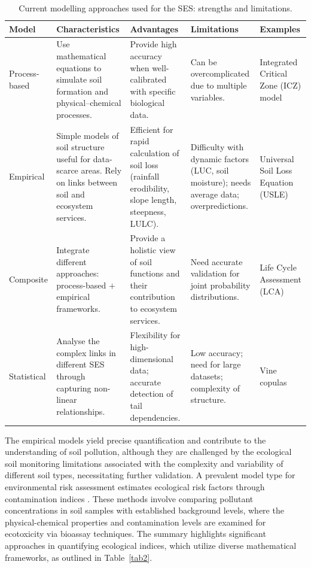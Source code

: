 \documentclass[sn-mathphys-num]{sn-jnl}
\begin{document}
\begin{table}[htbp]
\caption{Current modelling approaches used for the SES: strengths and
    limitations.}\label{tab3}
\begin{tabularx}{\textwidth}{@{} l p{2.5cm} p{2.5cm} p{2.5cm} X @{}}
\toprule
\textbf{Model} & \textbf{Characteristics} & \textbf{Advantages}
    & \textbf{Limitations} & \textbf{Examples} \\
\midrule
Process-based
    & Use mathematical equations to simulate soil formation and
      physical--chemical processes.
    & Provide high accuracy when well-calibrated with specific biological
      data.
    & Can be overcomplicated due to multiple variables.
    & Integrated Critical Zone (ICZ) model \cite{Giannakis2017} \\[6pt]
Empirical
    & Simple models of soil structure useful for data-scarce areas. Rely on
      links between soil and ecosystem services.
    & Efficient for rapid calculation of soil loss (rainfall erodibility,
      slope length, steepness, LULC).
    & Difficulty with dynamic factors (LUC, soil moisture); needs average
      data; overpredictions.
    & Universal Soil Loss Equation (USLE) \cite{Benavidez2018} \\[6pt]
Composite
    & Integrate different approaches: process-based $+$ empirical
      frameworks.
    & Provide a holistic view of soil functions and their contribution to
      ecosystem services.
    & Need accurate validation for joint probability distributions.
    & Life Cycle Assessment (LCA) \cite{Sadhukhan2022} \\[6pt]
Statistical
    & Analyse the complex links in different SES through capturing
      non-linear relationships.
    & Flexibility for high-dimensional data; accurate detection of tail
      dependencies.
    & Low accuracy; need for large datasets; complexity of structure.
    & Vine copulas \cite{Lu2020} \\
\bottomrule
\end{tabularx}
\end{table}

The empirical models yield precise quantification and contribute to the
understanding of soil pollution, although they are challenged by the
ecological soil monitoring limitations associated with the complexity and
variability of different soil types, necessitating further validation. A
prevalent model type for environmental risk assessment estimates ecological
risk factors through contamination indices
\cite{Stojic2019,Mohammad2025,Sun2025,Edo2024,Chon2011,Ferreira2022}. These
methods involve comparing pollutant concentrations in soil samples with
established background levels, where the physical-chemical properties and
contamination levels are examined for ecotoxicity via bioassay techniques. The
summary highlights significant approaches in quantifying ecological indices,
which utilize diverse mathematical frameworks, as outlined in
Table~\ref{tab2}.
\end{document}
